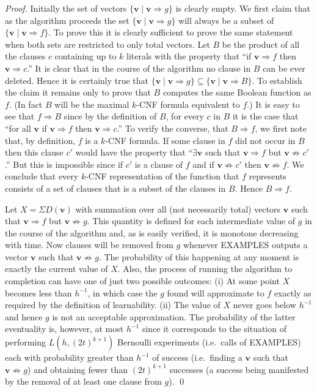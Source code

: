 \begin{proof}
Initially the set of vectors $\{\mathbf{v} \mid \mathbf{v} \Rightarrow g\}$
is clearly empty. We first claim that as the algorithm proceeds the
set $\{\mathbf{v} \mid \mathbf{v} \Rightarrow g\}$ will always be a
subset of $\{\mathbf{v} \mid \mathbf{v} \Rightarrow f\}$. To prove
this it is clearly sufficient to prove the same statement when both
sets are restricted to only total vectors. Let $B$ be the product of
all the clauses $c$ containing up to $k$ literals with the property
that ``if $\mathbf{v} \Rightarrow f$ then
$\mathbf{v} \Rightarrow c$.'' It is clear that in the course of the
algorithm no clause in $B$ can be ever deleted. Hence it is certainly
true that
$\{\mathbf{v} \mid \mathbf{v} \Rightarrow g\} \subseteq \{\mathbf{v} \mid \mathbf{v} \Rightarrow B\}$.
To establish the claim it remains only to prove that $B$ computes the
same Boolean function as $f$. (In fact $B$ will be the maximal
$k$-CNF formula equivalent to $f$.) It is easy to see that
$f \Rightarrow B$ since by the definition of $B$, for every $c$ in
$B$ it is the case that ``for all $\mathbf{v}$ if
$\mathbf{v} \Rightarrow f$ then $\mathbf{v} \Rightarrow c$.'' To
verify the converse, that $B \Rightarrow f$, we first note that, by
definition, $f$ is a $k$-CNF formula. If some clause in $f$ did not
occur in $B$ then this clause $c'$ would have the property that
``$\exists \mathbf{v}$ such that $\mathbf{v} \Rightarrow f$ but
$\mathbf{v} \not\Rightarrow c'$.'' But this is impossible since if
$c'$ is a clause of $f$ and if $\mathbf{v} \not\Rightarrow c'$ then
$\mathbf{v} \not\Rightarrow f$. We conclude that every $k$-CNF
representation of the function that $f$ represents consists of a set
of clauses that is a subset of the clauses in $B$. Hence
$B \Rightarrow f$.

Let $X = \Sigma D(\mathbf{v})$ with summation over all (not
necessarily total) vectors $\mathbf{v}$ such that
$\mathbf{v} \Rightarrow f$ but $\mathbf{v} \not\Rightarrow g$. This
quantity is defined for each intermediate value of $g$ in the course
of the algorithm and, as is easily verified, it is monotone
decreasing with time. Now clauses will be removed from $g$ whenever
EXAMPLES outputs a vector $\mathbf{v}$ such that
$\mathbf{v} \not\Rightarrow g$. The probability of this happening at
any moment is exactly the current value of $X$. Also, the process of
running the algorithm to completion can have one of just two possible
outcomes: (i) At some point $X$ becomes less than $h^{-1}$, in which
case the $g$ found will approximate to $f$ exactly as required by the
definition of learnability. (ii) The value of $X$ never goes below
$h^{-1}$ and hence $g$ is not an acceptable approximation. The
probability of the latter eventuality is, however, at most $h^{-1}$
since it corresponds to the situation of performing
$L(h, (2t)^{k+1})$ Bernoulli experiments (i.e.\ calls of EXAMPLES)
each with probability greater than $h^{-1}$ of success (i.e.\ finding
a $\mathbf{v}$ such that $\mathbf{v} \not\Rightarrow g$) and
obtaining fewer than $(2t)^{k+1}$ successes (a success being
manifested by the removal of at least one clause from $g$).
\qed
\end{proof}

